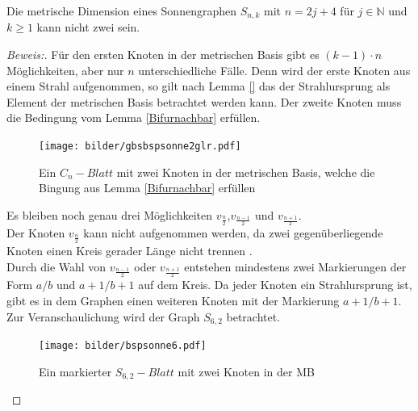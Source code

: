 \begin{lem}
Die metrische Dimension eines Sonnengraphen $S_{n,k}$ mit $n = 2j+4$ für $j \in \mathbb{N}$ und $k \geq 1$ kann nicht zwei sein. 
\end{lem}
\begin{proof}[Beweis:]
Für den ersten Knoten in der metrischen Basis gibt es $(k-1)\cdot n$ Möglichkeiten, aber nur $n$ unterschiedliche Fälle. Denn wird der erste Knoten aus einem Strahl aufgenommen, so gilt nach Lemma \ref{} das der Strahlursprung als Element der metrischen Basis betrachtet werden kann. Der zweite Knoten muss die Bedingung vom Lemma \ref{Bifurnachbar} erfüllen.  
 \begin{figure}[h!]
		\centering
 		 \texttt{[image: bilder/gbsbspsonne2glr.pdf]}
   \caption{Ein $C_{n}-Blatt$ mit zwei Knoten in der metrischen Basis, welche die Bingung aus Lemma \ref{Bifurnachbar} erfüllen}
  	 \end{figure}
  	  	 
  	 Es bleiben noch genau drei Möglichkeiten $v_{\frac{n}{2}}$,$v_{\frac{n-1}{2}}$ und $v_{\frac{n+1}{2}}$.\\ 
Der Knoten $v_{\frac{n}{2}}$ kann nicht aufgenommen werden, da zwei gegenüberliegende Knoten einen Kreis gerader Länge nicht trennen \cite{}.\\
Durch die Wahl von $v_{\frac{n-1}{2}}$ oder $v_{\frac{n+1}{2}}$ entstehen mindestens zwei Markierungen der Form $a/b$ und $a+1/b+1$ auf dem Kreis. Da jeder Knoten ein Strahlursprung ist, gibt es in dem Graphen einen weiteren Knoten mit der Markierung $a+1/b+1$. Zur Veranschaulichung wird der Graph $S_{6,2}$ betrachtet.
\begin{figure}[h!]
		\centering
 		 \texttt{[image: bilder/bspsonne6.pdf]}
   \caption{Ein markierter $S_{6,2}-Blatt$ mit zwei Knoten in der MB}
  	 \end{figure}
\end{proof}
